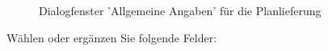 \begin{figure}[H]
\caption{Dialogfenster 'Allgemeine Angaben' für die Planlieferung}
\end{figure}

Wählen oder ergänzen Sie folgende Felder:

